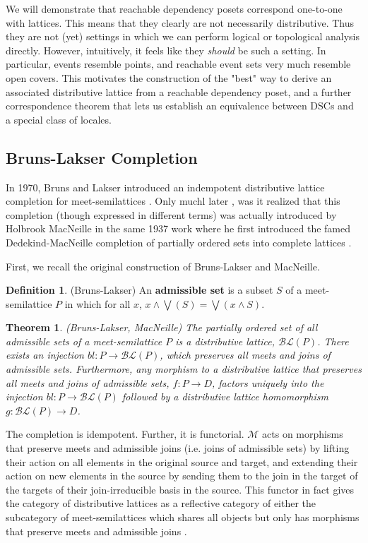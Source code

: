 \documentclass[hoptionsi,review,format=acmsmall]{acmart}
\newtheorem{theorem}{Theorem}[section]
\theoremstyle{definition}
\newtheorem{definition}{Definition}[section]
\newcommand{\Mcc}{\mathcal{M}}
\newcommand{\BLc}{\mathcal{BL}}
\begin{document}
We will demonstrate that reachable dependency posets correspond one-to-one with lattices. This means that they clearly are not necessarily distributive. Thus they are not (yet) settings in which we can perform logical or topological analysis directly. However, intuitively, it feels like they \textit{should} be such a setting. In particular, events resemble points, and reachable event sets very much resemble open covers. This motivates the construction of the "best" way to derive an associated distributive lattice from a reachable dependency poset, and a further correspondence theorem that lets us establish an equivalence between DSCs and a special class of locales.

\subsection{Bruns-Lakser Completion}

In 1970, Bruns and Lakser introduced an indempotent distributive lattice completion for meet-semilattices \cite{bruns1970injective}. Only muchl later \cite{ball2016dedekind}, was it realized that this completion (though expressed in different terms) was actually introduced by  Holbrook MacNeille in the same 1937 work where he first introduced the famed Dedekind-MacNeille completion of partially ordered sets into complete lattices \cite{macneille1937partially}. 

First, we recall the original construction of Bruns-Lakser and MacNeille.

\begin{definition}
(Bruns-Lakser) An \textbf{admissible set} is a subset \(S\) of a meet-semilattice \(P\) in which for all \(x\), \(x \wedge \bigvee(S) = \bigvee(x \wedge S)\).
\end{definition}

\begin{theorem}
(Bruns-Lakser, MacNeille) The partially ordered set of all admissible sets of a meet-semilattice \(P\) is a distributive lattice, \(\BLc(P)\). There exists an injection \(bl : P \rightarrow \BLc(P)\), which preserves all meets and joins of admissible sets. Furthermore, any morphism to a distributive lattice that preserves all meets and joins of admissible sets, \(f : P \rightarrow D\), factors uniquely into the injection \(bl : P \rightarrow \BLc(P)\) followed by a distributive lattice homomorphism \(g : \BLc(P) \rightarrow D\).
\end{theorem}

The completion is idempotent. Further, it is functorial. \(\Mcc\) acts on morphisms that preserve meets and admissible joins (i.e. joins of admissible sets) by lifting their action on all elements in the original source and target, and extending their action on new elements in the source by sending them to the join in the target of the targets of their join-irreducible basis in the source. This functor in fact gives the category of distributive lattices as a reflective category of either the subcategory of meet-semilattices which shares all objects but only has morphisms that preserve meets and admissible joins \cite{gehrke2014distributive}.
\end{document}
